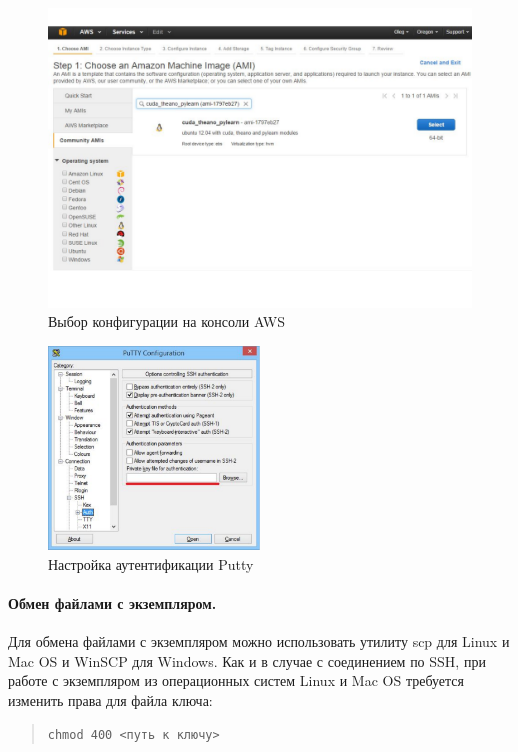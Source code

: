 \documentclass[12pt]{article}
\begin{document}
\begin{figure}[!hbp]
 \centering
  \includegraphics[totalheight=12	cm]{ami.pdf}
 \caption{Выбор конфигурации на консоли AWS}
 \label{fig:ami}
\end{figure}

\begin{figure}[!hb]
 \centering
  \includegraphics[width=0.5\textwidth]{putty.pdf}
 \caption{Настройка аутентификации Putty}
 \label{fig:putty}
\end{figure}


\paragraph{Обмен файлами с экземпляром.}
Для обмена файлами с экземпляром можно использовать утилиту scp для Linux и Mac OS и WinSCP для Windows. Как и в случае с соединением по SSH, при работе с экземпляром из операционных систем Linux и Mac OS требуется изменить права для файла ключа:
\begin{quote}
\tt{chmod 400 <путь к ключу>}
\end{quote}
\end{document}
